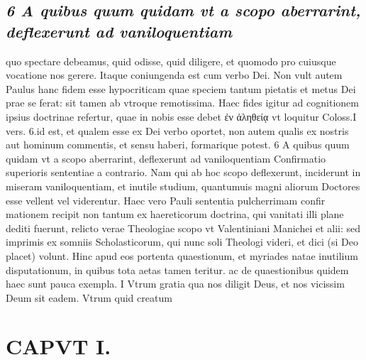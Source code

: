 \documentclass{article}
\begin{document}
\begin{pages}
\subsection*{\textit{6 A quibus quum quidam vt a scopo aberrarint, deflexerunt ad vaniloquentiam}}quo spectare debeamus, quid odisse, quid diligere, et quomodo pro cuiusque vocatione nos gerere. Itaque coniungenda est cum verbo Dei. Non vult autem Paulus hanc fidem esse hypocriticam quae speciem tantum pietatis et metus Dei prae se ferat: sit tamen ab vtroque remotissima. Haec fides igitur ad cognitionem ipsius doctrinae refertur, quae in nobis esse debet ἐν ἀληθείᾳ vt loquitur Coloss.I vers. 6.id est, et qualem esse ex Dei verbo oportet, non autem qualis ex nostris aut hominum commentis, et sensu haberi, formarique potest. 6 A quibus quum quidam vt a scopo aberrarint, deflexerunt ad vaniloquentiam Confirmatio superioris sententiae a contrario. Nam qui ab hoc scopo deflexerunt, inciderunt in miseram vaniloquentiam, et inutile studium, quantumuis magni aliorum Doctores esse vellent vel viderentur. Haec vero Pauli sententia pulcherrimam confir mationem recipit non tantum ex haereticorum doctrina, qui vanitati illi plane dediti fuerunt, relicto verae Theologiae scopo vt Valentiniani Manichei et alii: sed imprimis ex somniis Scholasticorum, qui nunc soli Theologi videri, et dici (si Deo placet) volunt. Hinc apud eos portenta quaestionum, et myriades natae inutilium disputationum, in quibus tota aetas tamen teritur. ac de quaestionibus quidem haec sunt pauca exempla. I Vtrum gratia qua nos diligit Deus, et nos vicissim Deum sit eadem. Vtrum quid creatum  \pend
\section*{CAPVT  I. }
\marginpar{[ p.17 ]}\pstart {}
{}

\end{pages}
\end{document}
